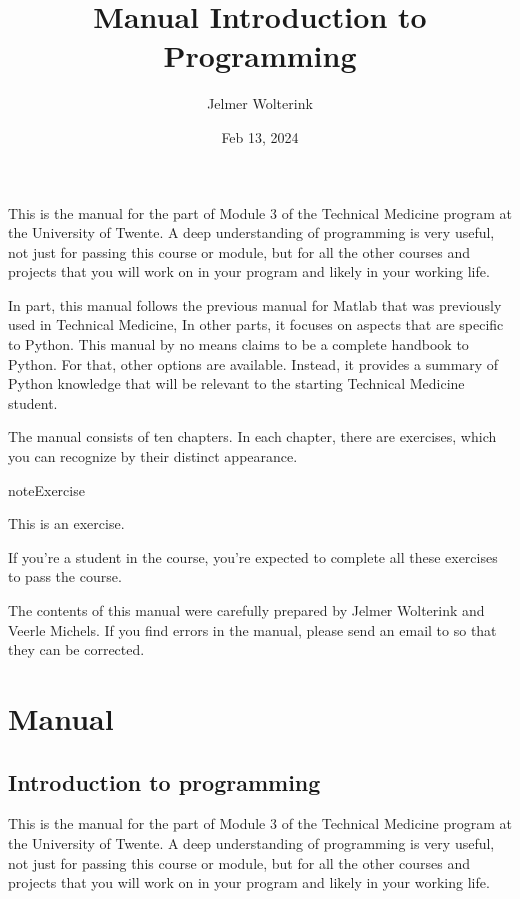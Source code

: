 \documentclass[letterpaper,10pt,english]{jupyterBook}
\title{Manual Introduction to Programming}
\date{Feb 13, 2024}
\author{Jelmer Wolterink}
\begin{document}
\pagestyle{empty}
\sphinxmaketitle
\pagestyle{plain}
\sphinxtableofcontents
\pagestyle{normal}
\label{\detokenize{index::doc}}


\sphinxAtStartPar
This is the manual for the  part of Module 3 of the Technical Medicine program at the University of Twente. A deep understanding of programming is very useful, not just for passing this course or module, but for all the other courses and projects that you will work on in your  program and \sphinxhyphen{} likely \sphinxhyphen{} in your working life.

\sphinxAtStartPar
In part, this manual follows the previous manual for Matlab that was previously used in Technical Medicine, In other parts, it focuses on aspects that are specific to Python. This manual by no means claims to be a complete handbook to Python. For that, other options are available. Instead, it provides a summary of Python knowledge that will be relevant to the starting Technical Medicine student.

\sphinxAtStartPar
The manual consists of ten chapters. In each chapter, there are exercises, which you can recognize by their distinct appearance.

\begin{sphinxadmonition}{note}{Exercise}

\sphinxAtStartPar
This is an exercise.
\end{sphinxadmonition}

\sphinxAtStartPar
If you’re a student in the  course, you’re expected to complete all these exercises to pass the course.

\sphinxAtStartPar
The contents of this manual were carefully prepared by Jelmer Wolterink and Veerle Michels. If you find errors in the manual, please send an e\sphinxhyphen{}mail to  so that they can be corrected.

\sphinxstepscope


\part{Manual}

\sphinxstepscope


\chapter{Introduction to programming}
\label{\detokenize{frontmatter/preface:introduction-to-programming}}\label{\detokenize{frontmatter/preface::doc}}
\sphinxAtStartPar
This is the manual for the  part of Module 3 of the Technical Medicine program at the University of Twente. A deep understanding of programming is very useful, not just for passing this course or module, but for all the other courses and projects that you will work on in your  program and \sphinxhyphen{} likely \sphinxhyphen{} in your working life.
\end{document}
